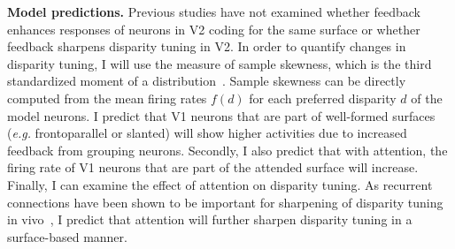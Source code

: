 \documentclass[11pt,notitlepage]{article}
\newcommand{\eg}[0]{{\em e.g.}\xspace}
\begin{document}
\textbf{Model predictions.} Previous studies have not examined whether feedback enhances responses of neurons in V2 coding for the same surface or whether feedback sharpens disparity
tuning in V2.
In order to quantify changes in disparity tuning, I
will use the measure of sample skewness, which is the third
standardized moment of a distribution~\citep{Samonds_etal13}. Sample
skewness can be directly computed from the mean firing rates $f(d) $
for each preferred disparity $d$ of the model neurons. I predict that
V1 neurons that
are part of well-formed surfaces (\eg frontoparallel or slanted) will show higher activities due to
increased feedback from grouping neurons. Secondly, I also predict
that with attention, the firing rate of V1 neurons that are part of
the attended surface will increase. Finally, I can examine the effect
of attention on disparity tuning. As recurrent connections have been
shown to be important for sharpening of disparity tuning in
vivo~\citep{Samonds_etal13}, I predict that attention will further
sharpen disparity tuning in a surface-based manner. 
\end{document}
